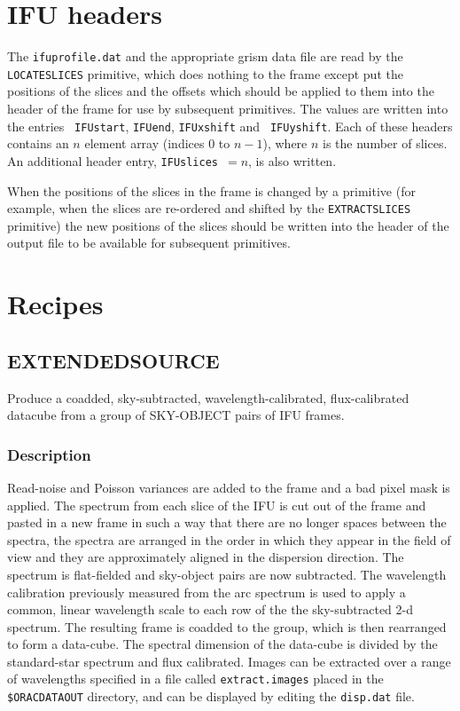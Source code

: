 \documentclass[twoside,11pt]{article}
\renewcommand{\_}{\texttt{\symbol{95}}}
\begin{document}
\section{IFU headers}

The {\tt ifu\_profile.dat} and the appropriate grism data file are read
by the {\tt \_LOCATE\_SLICES\_} primitive, which does nothing to the
frame except put the positions of the slices and the offsets which
should be applied to them into the header of the frame for use by
subsequent primitives. The values are written into the entries {\tt
  IFU\_start}, {\tt IFU\_end}, {\tt IFU\_xshift} and {\tt
  IFU\_yshift}. Each of these headers contains an $n$ element array
(indices 0 to $n-1$), where $n$ is the number of slices. An additional
header entry, {\tt IFU\_slices}~$=n$, is also written.

When the positions of the slices in the frame is changed by a
primitive (for example, when the slices are re-ordered and shifted by
the {\tt \_EXTRACT\_SLICES\_} primitive) the new positions of the
slices should be written into the header of the output file to be
available for subsequent primitives.




\clearpage


\section{Recipes}

\subsection{EXTENDED\_SOURCE}

Produce a coadded, sky-subtracted, wavelength-calibrated,
flux-calibrated datacube from a group of SKY-OBJECT pairs of IFU
frames.

\subsubsection*{Description}

Read-noise and Poisson variances are added to the frame and a bad
pixel mask is applied. The spectrum from each slice of the IFU is cut
out of the frame and pasted in a new frame in such a way that there
are no longer spaces between the spectra, the spectra are arranged in
the order in which they appear in the field of view and they are
approximately aligned in the dispersion direction. The spectrum is
flat-fielded and sky-object pairs are now subtracted.  The wavelength
calibration previously measured from the arc spectrum is used to apply
a common, linear wavelength scale to each row of the the
sky-subtracted 2-d spectrum.  The resulting frame is coadded to the
group, which is then rearranged to form a data-cube. The spectral
dimension of the data-cube is divided by the standard-star spectrum
and flux calibrated. Images can be extracted over a range of
wavelengths specified in a file called {\tt extract.images} placed in
the {\tt \$ORAC\_DATA\_OUT} directory, and can be displayed by editing
the {\tt disp.dat} file.
\end{document}
